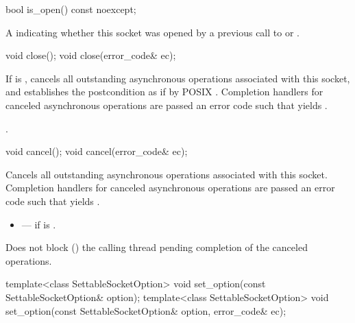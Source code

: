 \begin{itemdecl}
bool is_open() const noexcept;
\end{itemdecl}

\begin{itemdescr}
\pnum
\returns A  indicating whether this socket was opened by a previous call to  or .
\end{itemdescr}

\begin{itemdecl}
void close();
void close(error_code& ec);
\end{itemdecl}

\begin{itemdescr}
\pnum
\effects If  is , cancels all outstanding asynchronous operations associated with this socket, and establishes the postcondition as if by POSIX . Completion handlers for canceled asynchronous operations are passed an error code  such that  yields .

\pnum
\postconditions {}.
\end{itemdescr}

\begin{itemdecl}
void cancel();
void cancel(error_code& ec);
\end{itemdecl}

\begin{itemdescr}
\pnum
\effects Cancels all outstanding asynchronous operations associated with this socket. Completion handlers for canceled asynchronous operations are passed an error code  such that  yields .

\pnum
\errors
\begin{itemize}
\item
{} --- if  is .
\end{itemize}

\pnum
\remarks Does not block () the calling thread pending completion of the canceled operations.
\end{itemdescr}

\begin{itemdecl}
template<class SettableSocketOption>
  void set_option(const SettableSocketOption& option);
template<class SettableSocketOption>
  void set_option(const SettableSocketOption& option, error_code& ec);
\end{itemdecl}

